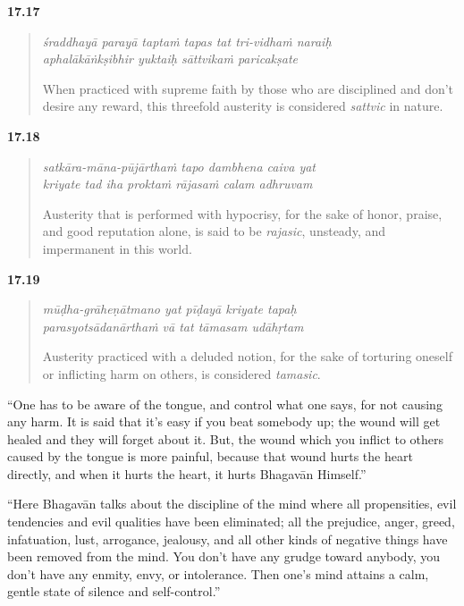 \par\noindent\textbf{17.17}\par
\begin{verse}
\textit{śraddhayā parayā taptaṁ tapas tat tri-vidhaṁ naraiḥ} \\
\textit{aphalākāṅkṣibhir yuktaiḥ sāttvikaṁ paricakṣate}

\noindent When practiced with supreme faith by those who are disciplined and don't desire any reward, this threefold austerity is considered \textit{sattvic} in nature.
\end{verse}
\par



\par\noindent\textbf{17.18}\par
\begin{verse}
\textit{satkāra-māna-pūjārthaṁ tapo dambhena caiva yat} \\
\textit{kriyate tad iha proktaṁ rājasaṁ calam adhruvam}

\noindent Austerity that is performed with hypocrisy, for the sake of honor, praise, and good reputation alone, is said to be \textit{rajasic}, unsteady, and impermanent in this world.
\end{verse}
\par



\par\noindent\textbf{17.19}\par
\begin{verse}
\textit{mūḍha-grāheṇātmano yat pīḍayā kriyate tapaḥ} \\
\textit{parasyotsādanārthaṁ vā tat tāmasam udāhṛtam}

\noindent Austerity practiced with a deluded notion, for the sake of torturing oneself or inflicting harm on others, is considered \textit{tamasic}.
\end{verse}
\par


\enquote{One has to be aware of the tongue, and control what one says, for not causing any harm. It is said that it’s easy if you beat somebody up; the wound will get healed and they will forget about it. But, the wound which you inflict to others caused by the tongue is more painful, because that wound hurts the heart directly, and when it hurts the heart, it hurts Bhagavān Himself.}

\enquote{Here Bhagavān talks about the discipline of the mind where all propensities, evil tendencies and evil qualities have been eliminated; all the prejudice, anger, greed, infatuation, lust, arrogance, jealousy, and all other kinds of negative things have been removed from the mind. You don’t have any grudge toward anybody, you don’t have any enmity, envy, or intolerance. Then one’s mind attains a calm, gentle state of silence and self-control.}

